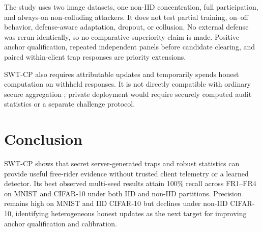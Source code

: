 \documentclass[conference]{IEEEtran}
\begin{document}
The study uses two image datasets, one non-IID concentration, full participation, and always-on non-colluding attackers. It does not test partial training, on--off behavior, defense-aware adaptation, dropout, or collusion. No external defense was rerun identically, so no comparative-superiority claim is made. Positive anchor qualification, repeated independent panels before candidate clearing, and paired within-client trap responses are priority extensions.

SWT-CP also requires attributable updates and temporarily spends honest computation on withheld responses. It is not directly compatible with ordinary secure aggregation \cite{bonawitz2017practical}; private deployment would require securely computed audit statistics or a separate challenge protocol.

\section{Conclusion}
SWT-CP shows that secret server-generated traps and robust statistics can provide useful free-rider evidence without trusted client telemetry or a learned detector. Its best observed multi-seed results attain 100\% recall across FR1--FR4 on MNIST and CIFAR-10 under both IID and non-IID partitions. Precision remains high on MNIST and IID CIFAR-10 but declines under non-IID CIFAR-10, identifying heterogeneous honest updates as the next target for improving anchor qualification and calibration.



\end{document}

